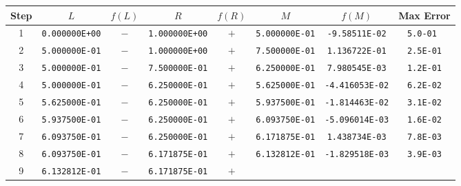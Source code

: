 \begin{example}
    \begin{longtable}[t]{c|c|c|c|c|c|c|c}
        Step                  &
        \( L \)               & \( f(L) \)             &
        \( R \)               & \( f(R) \)             &
        \( M \)               & \( f(M) \)             & Max Error        \\ \hline \hline
        1                     &
        \texttt{0.000000E+00} & \(-\)                  &
        \texttt{1.000000E+00} & \(+\)                  &
        \texttt{5.000000E-01} & \texttt{-9.58511E-02}  & \texttt{5.0-01 } \\
        2                     &
        \texttt{5.000000E-01} & \(-\)                  &
        \texttt{1.000000E+00} & \(+\)                  &
        \texttt{7.500000E-01} & \texttt{1.136722E-01}  & \texttt{2.5E-01} \\
        3                     &
        \texttt{5.000000E-01} & \(-\)                  &
        \texttt{7.500000E-01} & \(+\)                  &
        \texttt{6.250000E-01} & \texttt{7.980545E-03}  & \texttt{1.2E-01} \\
        4                     &
        \texttt{5.000000E-01} & \(-\)                  &
        \texttt{6.250000E-01} & \(+\)                  &
        \texttt{5.625000E-01} & \texttt{-4.416053E-02} & \texttt{6.2E-02} \\
        5                     &
        \texttt{5.625000E-01} & \(-\)                  &
        \texttt{6.250000E-01} & \(+\)                  &
        \texttt{5.937500E-01} & \texttt{-1.814463E-02} & \texttt{3.1E-02} \\
        6                     &
        \texttt{5.937500E-01} & \(-\)                  &
        \texttt{6.250000E-01} & \(+\)                  &
        \texttt{6.093750E-01} & \texttt{-5.096014E-03} & \texttt{1.6E-02} \\
        7                     &
        \texttt{6.093750E-01} & \(-\)                  &
        \texttt{6.250000E-01} & \(+\)                  &
        \texttt{6.171875E-01} & \texttt{1.438734E-03}  & \texttt{7.8E-03} \\
        8                     &
        \texttt{6.093750E-01} & \(-\)                  &
        \texttt{6.171875E-01} & \(+\)                  &
        \texttt{6.132812E-01} & \texttt{-1.829518E-03} & \texttt{3.9E-03} \\
        9                     &
        \texttt{6.132812E-01} & \(-\)                  &
        \texttt{6.171875E-01} & \(+\)                  &

\end{longtable}
\end{example}
